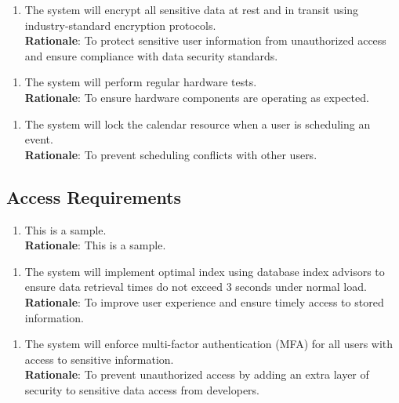 \documentclass{article}
\begin{document}
\begin{enumerate}[{SR}Zay2. ]
    \item The system will encrypt all sensitive data at rest and in transit using industry-standard encryption protocols.\\
    \textbf{Rationale}: To protect sensitive user information from unauthorized access and ensure compliance with data security standards.
\end{enumerate} 
\begin{enumerate}[{SR}Jan1. ]
    \item The system will perform regular hardware tests.\\
    \textbf{Rationale}: To ensure hardware components are operating as expected.
\end{enumerate} 
\begin{enumerate}[{SR}Jan2. ]
    \item The system will lock the calendar resource when a user is scheduling an event.\\
    \textbf{Rationale}: To prevent scheduling conflicts with other users.
\end{enumerate} 

\subsection{Access Requirements}
\begin{enumerate}[{AR}1. ]
    \item This is a sample.\\
    \textbf{Rationale}: This is a sample. 
\end{enumerate} 
\begin{enumerate}[{AR}Zay1. ]
    \item The system will implement optimal index using database index advisors to ensure data retrieval times do not exceed 3 seconds under normal load.\\
    \textbf{Rationale}: To improve user experience and ensure timely access to stored information.
\end{enumerate} 
\begin{enumerate}[{AR}Zay2. ]
    \item The system will enforce multi-factor authentication (MFA) for all users with access to sensitive information. \\
    \textbf{Rationale}: To prevent unauthorized access by adding an extra layer of security to sensitive data access from developers.
\end{enumerate} 
\end{document}

